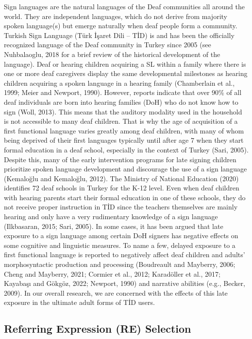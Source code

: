 \documentclass[]{elsarticle} %
\begin{document}
Sign languages are the natural languages of the Deaf communities all
around the world. They are independent languages, which do not derive
from majority spoken language(s) but emerge naturally when deaf people
form a community. Turkish Sign Language (Türk İşaret Dili -- TİD) is and
has been the officially recognized language of the Deaf community in
Turkey since 2005 (see Nuhbalaoglu, 2018 for a brief review of the
historical development of the language). Deaf or hearing children
acquiring a SL within a family where there is one or more deaf
caregivers display the same developmental milestones as hearing children
acquiring a spoken language in a hearing family (Chamberlain et al.,
1999; Meier and Newport, 1990). However, reports indicate that over 90\%
of all deaf individuals are born into hearing families (DoH) who do not
know how to sign (Woll, 2013). This means that the auditory modality
used in the household is not accessible to many deaf children. That is
why the age of acquisition of a first functional language varies greatly
among deaf children, with many of whom being deprived of their first
languages typically until after age 7 when they start formal education
in a deaf school, especially in the context of Turkey (Sari, 2005).
Despite this, many of the early intervention programs for late signing
children prioritize spoken language development and discourage the use
of a sign language (Kemaloğlu and Kemaloğlu, 2012). The Ministry of
National Education (2020) identifies 72 deaf schools in Turkey for the
K-12 level. Even when deaf children with hearing parents start their
formal education in one of these schools, they do not receive proper
instruction in TİD since the teachers themselves are mainly hearing and
only have a very rudimentary knowledge of a sign language (Ilkbasaran,
2015; Sari, 2005). In some cases, it has been argued that late exposure
to a sign language among certain DoH signers has negative effects on
some cognitive and linguistic measures. To name a few, delayed exposure
to a first functional language is reported to negatively affect deaf
children and adults' morphosyntactic production and processing
(Boudreault and Mayberry, 2006; Cheng and Mayberry, 2021; Cormier et
al., 2012; Karadöller et al., 2017; Kayabaşı and Gökgöz, 2022; Newport,
1990) and narrative abilities (e.g., Becker, 2009). In our overall
research, we are concerned with the effects of this late exposure in the
ultimate adult forms of TİD users.

\hypertarget{referring-expression-re-selection}{%
\subsection{Referring Expression (RE)
Selection}\label{referring-expression-re-selection}}
\end{document}
